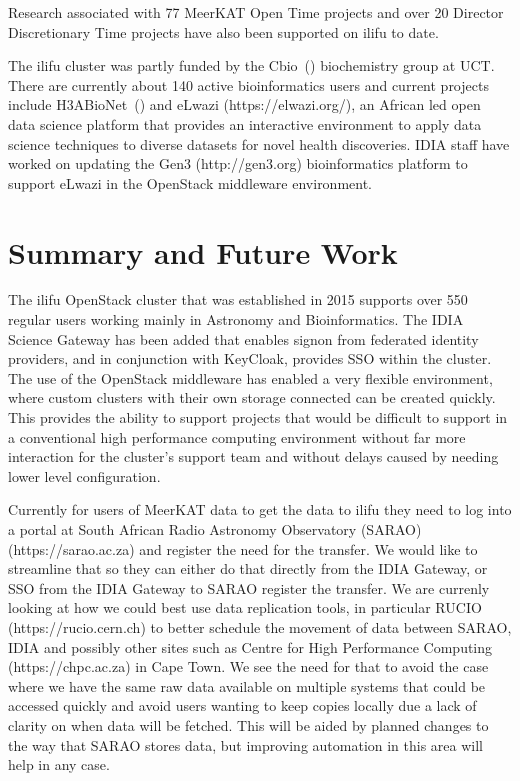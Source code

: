 \documentclass{iau_FM}
\begin{document}
Research associated with 
77 MeerKAT Open Time projects and over 20 Director Discretionary Time projects have also been supported
on ilifu to date.


The ilifu cluster was partly funded by the Cbio~(\cite{cbio})
biochemistry group at UCT.
There are currently about 140 active bioinformatics users and 
current projects include H3ABioNet~(\cite{H3ABioNet})
and eLwazi (https://elwazi.org/),
an African led open data science platform that provides an interactive environment 
to apply data science techniques to 
diverse datasets for novel health discoveries.
IDIA staff have worked on updating the Gen3 (http://gen3.org) bioinformatics platform 
to support eLwazi in the OpenStack
middleware environment.


\section{Summary and Future Work}
\label{sec:conclusions}


The ilifu OpenStack cluster that was established in 2015 supports over 550 regular users working mainly in Astronomy
and Bioinformatics. The IDIA Science Gateway has been added that enables signon from federated identity providers, and 
in conjunction with KeyCloak, provides SSO within the cluster. The use of the OpenStack middleware
has enabled a very flexible environment, where custom clusters with their own storage connected can be
created quickly. This provides the ability to support projects that would be difficult to support in
a conventional high performance computing environment without far more interaction for the cluster's
support team and without delays caused by needing lower level configuration.

Currently for users of MeerKAT data to get the data to ilifu they need to log into a portal at
South African Radio Astronomy Observatory (SARAO) (https://sarao.ac.za)
and register the need for the transfer. We would like to streamline that so
they can either do that directly from the IDIA Gateway, or SSO from the IDIA Gateway
to SARAO register the transfer. We are currenly looking at how we could best use data replication tools, 
in particular
RUCIO (https://rucio.cern.ch) to better schedule the movement of data between SARAO, 
IDIA and possibly other sites such 
as Centre for High Performance Computing (https://chpc.ac.za) in Cape Town. 
We see the need for that to avoid the case where 
we have the same raw data available
on multiple systems that could be accessed quickly and avoid users wanting to keep copies locally
due a lack of clarity on when data will be fetched. This will be aided by planned changes to the
way that SARAO stores data, but improving automation in this area will help in any case.
\end{document}

